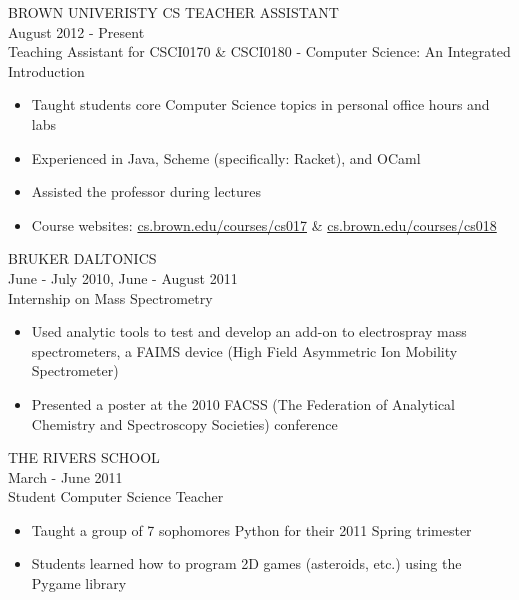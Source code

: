 \documentclass[11pt]{res} %
\begin{document}
\begin{resume}
BROWN UNIVERISTY CS TEACHER ASSISTANT \\
August 2012 - Present \\
Teaching Assistant for CSCI0170 \& CSCI0180 - Computer Science: An Integrated Introduction
\vspace{0.02in}
   \begin{itemize} \itemsep -2pt
   \item Taught students core Computer Science topics in personal office hours and labs
   \item Experienced in Java, Scheme (specifically: Racket), and OCaml
   \item Assisted the professor during lectures
   \item Course websites: 
      \href{http://cs.brown.edu/courses/cs017}{cs.brown.edu/courses/cs017} \&
      \href{http://cs.brown.edu/courses/cs018}{cs.brown.edu/courses/cs018}

   \end{itemize}

BRUKER DALTONICS \\
June - July 2010, June - August 2011 \\
Internship on Mass Spectrometry
\vspace{0.02in}
   \begin{itemize} \itemsep -2pt
   \item Used analytic tools to test and develop an add-on to electrospray mass spectrometers,  a FAIMS device (High Field Asymmetric Ion Mobility Spectrometer)
   \item Presented a poster at the 2010 FACSS (The Federation of Analytical Chemistry and Spectroscopy Societies) conference 
   \end{itemize}

THE RIVERS SCHOOL \\
March - June 2011 \\
Student Computer Science Teacher 
\vspace{0.02in}
   \begin{itemize} \itemsep -2pt  %
   \item Taught a group of 7 sophomores Python for their 2011 Spring trimester
   \item Students learned how to program 2D games (asteroids, etc.) using the Pygame library
 \end{itemize}


\end{resume}
\end{document}
